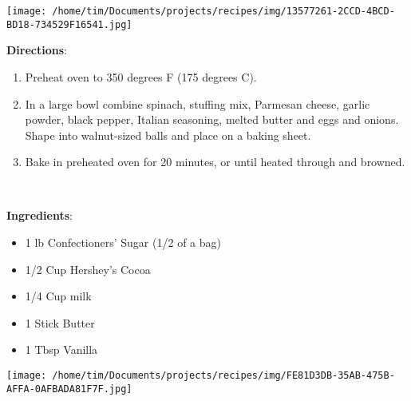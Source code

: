 \documentclass[11pt, twoside, openany]{book}
\begin{document}
\begin{minipage}[t]{0.2\linewidth}
\centering \strut\vspace*{-\baselineskip}\newline
\texttt{[image: /home/tim/Documents/projects/recipes/img/13577261-2CCD-4BCD-BD18-734529F16541.jpg]}\\
\end{minipage}\vspace{3mm}
\textbf{Directions}:
\vspace{-3mm}\begin{enumerate}\setlength\itemsep{-1mm}
\item Preheat oven to 350 degrees F (175 degrees C).
\item In a large bowl combine spinach, stuffing mix, Parmesan cheese, garlic powder, black pepper, Italian seasoning, melted butter and eggs and onions. Shape into walnut-sized balls and place on a baking sheet.
\item Bake in preheated oven for 20 minutes, or until heated through and browned.
\end{enumerate}
 \label{microwave-one-bowl-fudge}\hfill\textit{}\\
\begin{minipage}[t]{0.8\linewidth}
\textbf{Ingredients}:\vspace{-3mm}
\begin{multicols}{2}
\begin{itemize}\setlength\itemsep{-1mm}
\item 1 lb Confectioners' Sugar (1/2 of a bag)
\item 1/2 Cup Hershey's Cocoa
\item 1/4 Cup milk
\item 1 Stick Butter
\item 1 Tbsp Vanilla
\end{itemize}
\end{multicols}
\end{minipage}
\begin{minipage}[t]{0.2\linewidth}
\centering \strut\vspace*{-\baselineskip}\newline
\texttt{[image: /home/tim/Documents/projects/recipes/img/FE81D3DB-35AB-475B-AFFA-0AFBADA81F7F.jpg]}\\
\end{minipage}\vspace{3mm}
\end{document}
